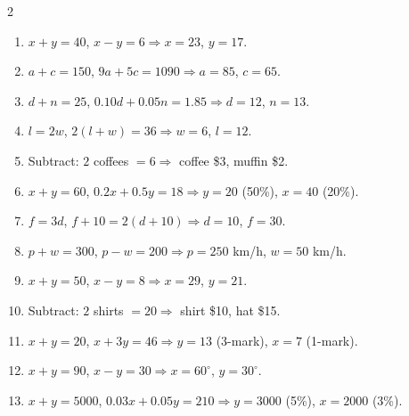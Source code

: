 \documentclass[11pt]{article}
\begin{document}
\begin{keybox}
\begin{multicols}{2}
\small
\begin{enumerate}[leftmargin=*,itemsep=3pt]
  \item $x+y=40$, $x-y=6\Rightarrow x=23$, $y=17$.
  \item $a+c=150$, $9a+5c=1090\Rightarrow a=85$, $c=65$.
  \item $d+n=25$, $0.10d+0.05n=1.85\Rightarrow d=12$, $n=13$.
  \item $l=2w$, $2(l+w)=36\Rightarrow w=6$, $l=12$.
  \item Subtract: $2$ coffees $=6\Rightarrow$ coffee \$3, muffin \$2.
  \item $x+y=60$, $0.2x+0.5y=18\Rightarrow y=20$ (50\%), $x=40$ (20\%).
  \item $f=3d$, $f+10=2(d+10)\Rightarrow d=10$, $f=30$.
  \item $p+w=300$, $p-w=200\Rightarrow p=250$ km/h, $w=50$ km/h.
  \item $x+y=50$, $x-y=8\Rightarrow x=29$, $y=21$.
  \item Subtract: $2$ shirts $=20\Rightarrow$ shirt \$10, hat \$15.
  \item $x+y=20$, $x+3y=46\Rightarrow y=13$ (3-mark), $x=7$ (1-mark).
  \item $x+y=90$, $x-y=30\Rightarrow x=60^\circ$, $y=30^\circ$.
  \item $x+y=5000$, $0.03x+0.05y=210\Rightarrow y=3000$ (5\%), $x=2000$ (3\%).
\end{enumerate}
\end{multicols}
\end{keybox}
\end{document}

